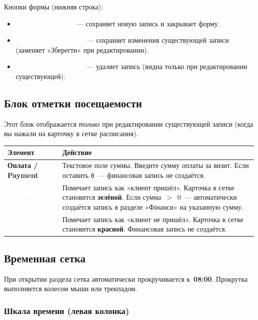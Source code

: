 \documentclass[12pt,a4paper]{article}
\newcommand{\btn}[2][primary]{%
  \textcolor{white}{\colorbox{#1}{\small\bfseries\,#2\,}}%
}
\newcommand{\btnred}[1]{\btn[danger]{#1}}
\newcommand{\btngreen}[1]{\btn[success!70!black]{#1}}
\begin{document}
Кнопки формы (нижняя строка):
\begin{itemize}
  \item \btn{Зберегти / Save}~--- сохраняет новую запись и закрывает форму.
  \item \btn{Оновити / Update}~--- сохраняет изменения существующей записи
    (заменяет «Зберегти» при редактировании).
  \item \btnred{Видалити / Delete}~--- удаляет запись
    (видна только при редактировании существующей).
\end{itemize}

\subsection{Блок отметки посещаемости}

\begin{notebox}
  Этот блок отображается \emph{только} при редактировании существующей
  записи (когда вы нажали на карточку в сетке расписания).
\end{notebox}

\bigskip
\begin{center}
\begin{tabularx}{0.9\textwidth}{>{\bfseries}lX}
  \toprule
  Элемент & Действие \\
  \midrule
  Оплата / Payment &
    Текстовое поле суммы. Введите сумму оплаты за визит.
    Если оставить \texttt{0}~--- финансовая запись не создаётся. \\[4pt]
  \btngreen{Прийшов / Attended} &
    Помечает запись как «клиент пришёл».
    Карточка в сетке становится \textbf{зелёной}.
    Если сумма~$>$~0~--- автоматически создаётся запись в
    разделе «Фінанси» на указанную сумму. \\[4pt]
  \btnred{Не прийшов / No-show} &
    Помечает запись как «клиент не пришёл».
    Карточка в сетке становится \textbf{красной}.
    Финансовая запись не создаётся. \\
  \bottomrule
\end{tabularx}
\end{center}

\subsection{Временная сетка}

При открытии раздела сетка автоматически прокручивается к~\textbf{08:00}.
Прокрутка выполняется колесом мыши или трекпадом.

\subsubsection{Шкала времени (левая колонка)}
\end{document}
